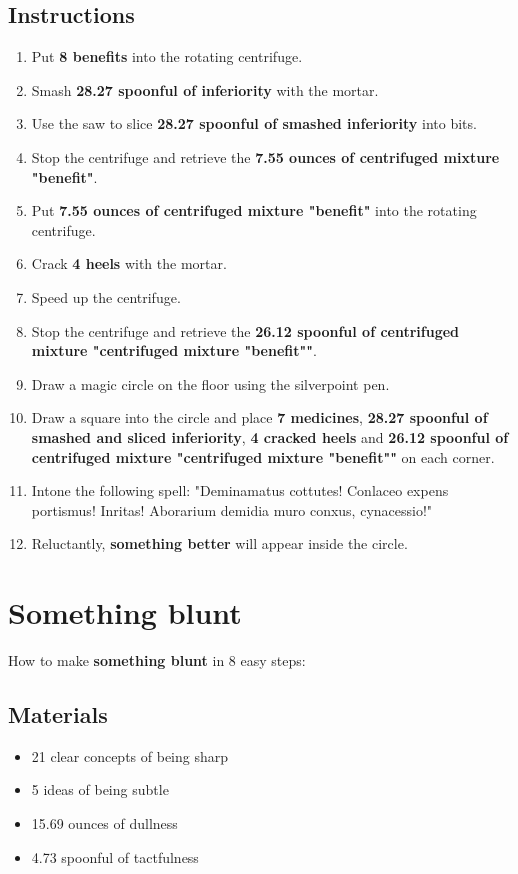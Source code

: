 \documentclass{article}
\begin{document}
\subsection{Instructions}\begin{enumerate}
\item 
Put \textbf{8 benefits} into the rotating centrifuge.
\item 
Smash \textbf{28.27 spoonful of inferiority} with the mortar.
\item 
Use the saw to slice \textbf{28.27 spoonful of smashed inferiority} into bits.
\item 
Stop the centrifuge and retrieve the \textbf{7.55 ounces of centrifuged mixture "benefit"}.
\item 
Put \textbf{7.55 ounces of centrifuged mixture "benefit"} into the rotating centrifuge.
\item 
Crack \textbf{4 heels} with the mortar.
\item 
Speed up the centrifuge.
\item 
Stop the centrifuge and retrieve the \textbf{26.12 spoonful of centrifuged mixture "centrifuged mixture "benefit""}.
\item 
Draw a magic circle on the floor using the silverpoint pen.
\item 
Draw a square into the circle and place \textbf{7 medicines}, \textbf{28.27 spoonful of smashed and sliced inferiority}, \textbf{4 cracked heels} and \textbf{26.12 spoonful of centrifuged mixture "centrifuged mixture "benefit""} on each corner.
\item 
Intone the following spell: "Deminamatus cottutes! Conlaceo expens portismus! Inritas! Aborarium demidia muro conxus, cynacessio!"
\item 
Reluctantly, \textbf{something better} will appear inside the circle.
\end{enumerate}
\newpage
\section{Something blunt}How to make \textbf{something blunt} in 8 easy steps:

\subsection{Materials}\begin{itemize}
\item 
21 clear concepts of being sharp
\item 
5 ideas of being subtle
\item 
15.69 ounces of dullness
\item 
4.73 spoonful of tactfulness
\end{itemize}
\end{document}

